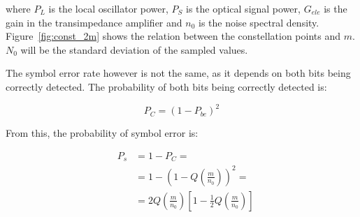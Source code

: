 where $P_L$ is the local oscillator power, $P_S$ is the optical signal power, $G_{ele}$ is the gain in the transimpedance amplifier and $n_0$ is the noise spectral density. Figure~\ref{fig:const_2m} shows the relation between the constellation points and $m$. $N_0$ will be the standard deviation of the sampled values.





The symbol error rate however is not the same, as it depends on both bits being correctly detected. The probability of both bits being correctly detected is:

\begin{equation}
P_C = (1 - P_{be})^2
\end{equation}

From this, the probability of symbol error is:

\begin{eqnarray}
&P_s &= 1-P_C =\nonumber \\
&	   &= 1 - \left(1 - Q \left({\frac{m}{n_0}}\right)\right)^2 = \nonumber \\
&	   &= 2 Q\left({\frac{m}{n_0}}\right)\left[1-\frac{1}{2} Q \left({\frac{m}{n_0}}\right)\right]
\end{eqnarray}





%
%
%
%
%

